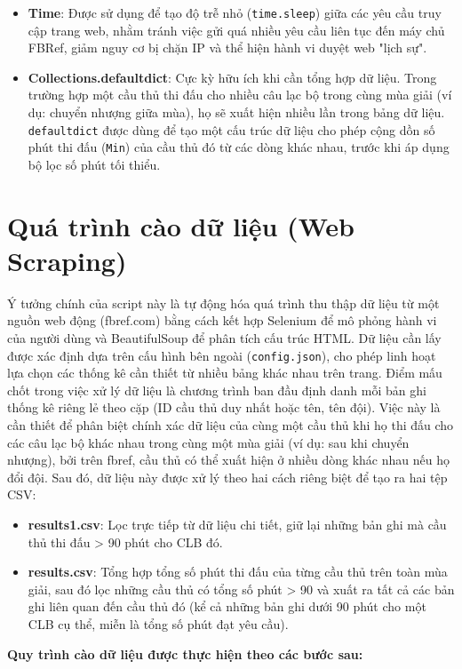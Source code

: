 \documentclass[12pt, a4paper]{report}
\begin{document}
\begin{itemize}
    \item \textbf{Time}: Được sử dụng để tạo độ trễ nhỏ (\texttt{time.sleep}) giữa các yêu cầu truy cập trang web, nhằm tránh việc gửi quá nhiều yêu cầu liên tục đến máy chủ FBRef, giảm nguy cơ bị chặn IP và thể hiện hành vi duyệt web "lịch sự".
    \item \textbf{Collections.defaultdict}: Cực kỳ hữu ích khi cần tổng hợp dữ liệu. Trong trường hợp một cầu thủ thi đấu cho nhiều câu lạc bộ trong cùng mùa giải (ví dụ: chuyển nhượng giữa mùa), họ sẽ xuất hiện nhiều lần trong bảng dữ liệu. \texttt{defaultdict} được dùng để tạo một cấu trúc dữ liệu cho phép cộng dồn số phút thi đấu (\texttt{Min}) của cầu thủ đó từ các dòng khác nhau, trước khi áp dụng bộ lọc số phút tối thiểu. 
\end{itemize}

\section{Quá trình cào dữ liệu (Web Scraping)}
Ý tưởng chính của script này là tự động hóa quá trình thu thập dữ liệu từ một nguồn web động (fbref.com) bằng cách kết hợp Selenium để mô phỏng hành vi của người dùng và BeautifulSoup để phân tích cấu trúc HTML. Dữ liệu cần lấy được xác định dựa trên cấu hình bên ngoài (\texttt{config.json}), cho phép linh hoạt lựa chọn các thống kê cần thiết từ nhiều bảng khác nhau trên trang.
Điểm mấu chốt trong việc xử lý dữ liệu là chương trình ban đầu định danh mỗi bản ghi thống kê riêng lẻ theo cặp (ID cầu thủ duy nhất hoặc tên, tên đội). Việc này là cần thiết để phân biệt chính xác dữ liệu của cùng một cầu thủ khi họ thi đấu cho các câu lạc bộ khác nhau trong cùng một mùa giải (ví dụ: sau khi chuyển nhượng), bởi trên fbref, cầu thủ có thể xuất hiện ở nhiều dòng khác nhau nếu họ đổi đội.
Sau đó, dữ liệu này được xử lý theo hai cách riêng biệt để tạo ra hai tệp CSV: 
\begin{itemize}
    \item \textbf{results1.csv}: Lọc trực tiếp từ dữ liệu chi tiết, giữ lại những bản ghi mà cầu thủ thi đấu > 90 phút cho CLB đó. 
    \item \textbf{results.csv}: Tổng hợp tổng số phút thi đấu của từng cầu thủ trên toàn mùa giải, sau đó lọc những cầu thủ có tổng số phút > 90 và xuất ra tất cả các bản ghi liên quan đến cầu thủ đó (kể cả những bản ghi dưới 90 phút cho một CLB cụ thể, miễn là tổng số phút đạt yêu cầu). 
\end{itemize}
\textbf{Quy trình cào dữ liệu được thực hiện theo các bước sau:}
\end{document}
